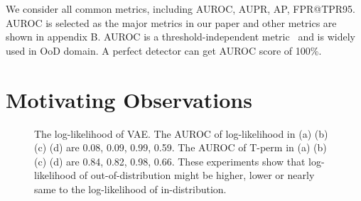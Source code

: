 \documentclass[letterpaper]{article} %
\begin{document}
We consider all common metrics, including AUROC, AUPR, AP, FPR@TPR95. AUROC is selected as the major metrics in our paper and other metrics are shown in appendix B. AUROC is a threshold-independent metric~\cite{davis2006relationship} and is widely used in OoD domain. A perfect detector can get AUROC score of 100\%. 

\section{Motivating Observations}\label{sec3}

\begin{figure}[t]
\centering
{}
\quad
{}
\caption{The log-likelihood of VAE. The AUROC of log-likelihood in (a) (b) (c) (d) are 0.08, 0.09, 0.99, 0.59. The AUROC of T-perm in (a) (b) (c) (d) are 0.84, 0.82, 0.98, 0.66. These experiments show that log-likelihood of out-of-distribution might be higher, lower or nearly same to the log-likelihood of in-distribution.}
\label{fig1}
\end{figure}
\end{document}
